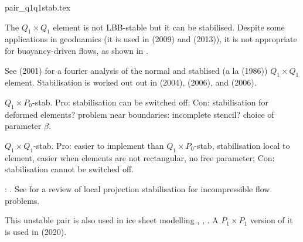 \begin{flushright} {\tiny {\color{gray} pair\_q1q1stab.tex}} \end{flushright}

\begin{minipage}[t]{0.5\textwidth}

\end{minipage}
\begin{minipage}[t]{0.5\textwidth}

\end{minipage}

The $Q_1\times Q_1$ element is not LBB-stable but it can be stabilised. Despite
some applications in geodnamics (it is used in \textcite{bugs09} (2009) 
and \textcite{busa13} (2013)), it is not appropriate for buoyancy-driven flows, 
as shown in \textcite{thba21}.

See \textcite{nosi01} (2001) for a fourier analysis of the normal 
and stablised (a la \textcite{hufb86} (1986)) $Q_1\times Q_1$ element.
Stabilisation is worked out out in \textcite{dobo04} (2004), \textcite{bodg06} (2006), 
and \textcite{bodo06} (2006).

$Q_1\times P_0$-stab. Pro: stabilisation can be switched off; Con: stabilisation for deformed elements? 
problem near boundaries: incomplete stencil? choice of parameter $\beta$.

$Q_1\times Q_1$-stab. Pro: easier to implement than $Q_1\times P_0$-stab, stabilisation local to element, easier when elements are not rectangular, no free parameter; Con: stabilisation cannot be switched off.

\Literature: \textcite{shry78,temr92,tezd92,grcc95,idsn95,knto00,fros07,lihc09}. 
See \textcite{brlu09} for a review of local projection stabilisation for incompressible flow problems. 

This unstable pair is also used in ice sheet modelling \textcite{heah18} , \textcite{zhjg11}, 
\textcite{zwgg07}. A $P_1\times P_1$ version of it is used in \textcite{kahp20} (2020).
